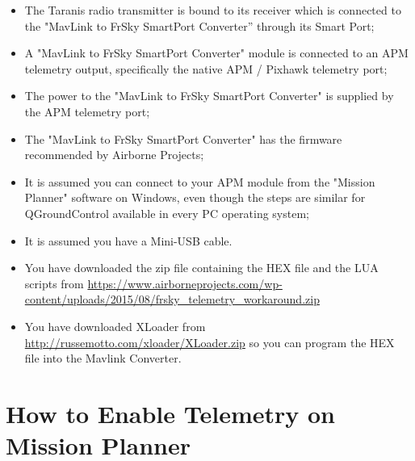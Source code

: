 \documentclass[english]{article}
\begin{document}
\begin{itemize}

\item The Taranis radio transmitter is bound to its receiver which is connected to the "MavLink
to FrSky SmartPort Converter” through its Smart Port;

\item A "MavLink to FrSky SmartPort Converter" module is connected to an APM telemetry
output, specifically the native APM / Pixhawk telemetry port;

\item The power to the "MavLink to FrSky SmartPort Converter" is supplied by the APM telemetry port;

\item The "MavLink to FrSky SmartPort Converter" has the firmware recommended by Airborne
Projects;

\item It is assumed you can connect to your APM module from the "Mission Planner" software
on Windows, even though the steps are similar for QGroundControl available in every PC
operating system;

\item It is assumed you have a Mini-USB cable.

\item You have downloaded the zip file containing the HEX file and the LUA scripts from \url{https://www.airborneprojects.com/wp-content/uploads/2015/08/frsky\_telemetry\_workaround.zip}

\item You have downloaded XLoader from \url{http://russemotto.com/xloader/XLoader.zip} so you can program the HEX file into the Mavlink Converter.

\end{itemize}

\section{How to Enable Telemetry on Mission Planner}
\end{document}
